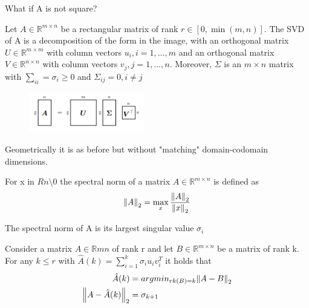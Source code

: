 What if A is not square? 
\begin{theorem}
    Let $A \in \mathbb{R}^{m\times n}$ be a rectangular matrix of rank $r \in [0,\min(m,n)]$. The SVD of A is a decomposition of the form in the image, with an orthogonal matrix $U \in \mathbb{R}^{m\times m}$ with column vectors $u_i, i = 1, \ldots,m$ and an orthogonal matrix $V \in \mathbb{R}^{n\times n}$ with column vectors $v_j, j = 1, \ldots,n$. Moreover, $\Sigma$ is an $m \times n$ matrix with $ \sum_{ii} = \sigma_i \geq 0$ and $\Sigma_{ij} = 0, i\neq j$ 
\end{theorem}
\begin{figure}[htbp]
    \centering
    \includegraphics[width=5cm]{Math/svd-diagram.png}
\end{figure}
Geometrically it is as before but without "matching" domain-codomain dimensions. 
\begin{definition}
    For x in $Rn \setminus {0}$ the spectral norm of a matrix $A \in \mathbb{R}^{m\times n}$ is defined as 
    \[ 
        \left\lVert A\right\rVert_2 = \max_{x}{\frac{\left\lVert A\right\rVert_2}{\left\lVert x\right\rVert_2}} 
    \]
\end{definition}
\begin{theorem}
    The spectral norm of A is its largest singular value $\sigma_i$
\end{theorem}
\begin{theorem}
    Consider a matrix $A \in \mathbb{R}mn$ of rank r and let $B \in \mathbb{R}^{m\times n}$ be a matrix of rank k. For any $k\leq r$ with $\hat{A}(k) = \sum_{i=1}^{k}{\sigma_iu_iv_i^T}$ it holds that
    \begin{align*}
        \hat{A}(k) &= argmin_{rk(B)=k}{\left\lVert A-B\right\rVert_2}\\
        \left\lVert A-\hat{A}(k)\right\rVert_2 &= \sigma_{k+1}
    \end{align*}
\end{theorem}